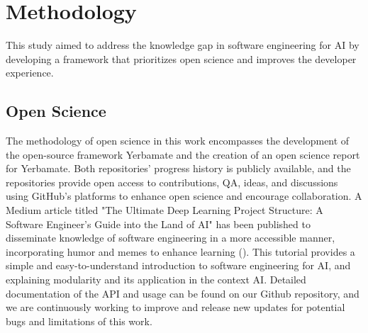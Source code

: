 


\section{Methodology}




This study aimed to address the knowledge gap in software engineering for AI by developing a framework that prioritizes open science and improves the developer experience. 

\subsection{Open Science}

The methodology of open science in this work encompasses the development of the open-source framework Yerbamate and the creation of an open science report for Yerbamate. Both repositories' progress history is publicly available, and the repositories provide open access to contributions, QA, ideas, and discussions using GitHub's platforms to enhance open science and encourage collaboration. A Medium article titled "The Ultimate Deep Learning Project Structure: A Software Engineer’s Guide into the Land of AI" has been published to disseminate knowledge of software engineering in a more accessible manner, incorporating humor and memes to enhance learning (\cite{powell1985humour}). This tutorial provides a simple and easy-to-understand introduction to software engineering for AI, and explaining modularity and its application in the context AI. Detailed documentation of the API and usage can be found on our Github repository, and we are continuously working to improve and release new updates for potential bugs and limitations of this work.


